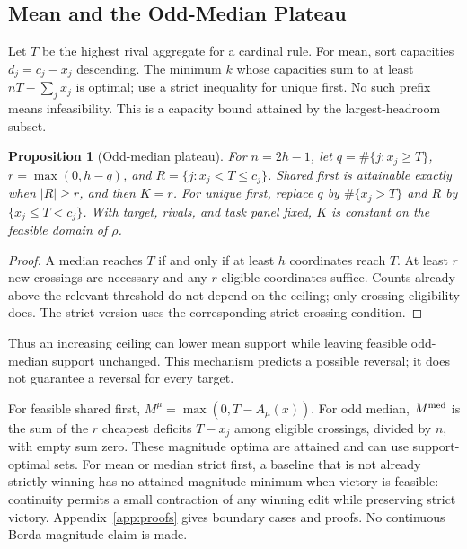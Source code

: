 \documentclass{article}
\newtheorem{proposition}[theorem]{Proposition}
\begin{document}
\subsection{Mean and the Odd-Median Plateau}
Let $T$ be the highest rival aggregate for a cardinal rule. For mean, sort capacities $d_j=c_j-x_j$ descending. The minimum $k$ whose capacities sum to at least $nT-\sum_jx_j$ is optimal; use a strict inequality for unique first. No such prefix means infeasibility. This is a capacity bound attained by the largest-headroom subset.

\begin{proposition}[Odd-median plateau]
For $n=2h-1$, let $q=\#\{j:x_j\ge T\}$, $r=\max(0,h-q)$, and $R=\{j:x_j<T\le c_j\}$. Shared first is attainable exactly when $|R|\ge r$, and then $K=r$. For unique first, replace $q$ by $\#\{x_j>T\}$ and $R$ by $\{x_j\le T<c_j\}$. With target, rivals, and task panel fixed, $K$ is constant on the feasible domain of $\rho$.
\label{prop:plateau}
\end{proposition}
\begin{proof}
A median reaches $T$ if and only if at least $h$ coordinates reach $T$. At least $r$ new crossings are necessary and any $r$ eligible coordinates suffice. Counts already above the relevant threshold do not depend on the ceiling; only crossing eligibility does. The strict version uses the corresponding strict crossing condition.
\end{proof}
Thus an increasing ceiling can lower mean support while leaving feasible odd-median support unchanged. This mechanism predicts a possible reversal; it does not guarantee a reversal for every target.

For feasible shared first, $M^\mu=\max(0,T-A_\mu(x))$. For odd median, $M^{\rm med}$ is the sum of the $r$ cheapest deficits $T-x_j$ among eligible crossings, divided by $n$, with empty sum zero. These magnitude optima are attained and can use support-optimal sets. For mean or median strict first, a baseline that is not already strictly winning has no attained magnitude minimum when victory is feasible: continuity permits a small contraction of any winning edit while preserving strict victory. Appendix~\ref{app:proofs} gives boundary cases and proofs. No continuous Borda magnitude claim is made.
\end{document}
